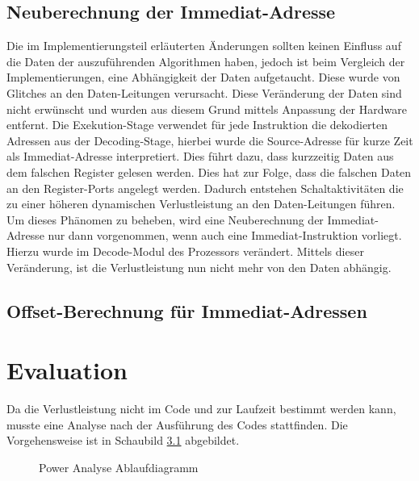 \section{Neuberechnung der Immediat-Adresse}
Die im Implementierungsteil erläuterten Änderungen sollten keinen Einfluss auf die Daten der auszuführenden Algorithmen haben, jedoch ist beim Vergleich der Implementierungen, eine Abhängigkeit der Daten aufgetaucht.
Diese wurde von Glitches an den Daten-Leitungen verursacht. Diese Veränderung der Daten sind nicht erwünscht und wurden aus diesem Grund mittels Anpassung der Hardware entfernt.
Die Exekution-Stage verwendet für jede Instruktion die dekodierten Adressen aus der Decoding-Stage, hierbei wurde die Source-Adresse für kurze Zeit als Immediat-Adresse interpretiert. Dies führt dazu, dass kurzzeitig Daten aus dem falschen Register gelesen werden. Dies hat zur Folge, dass die falschen Daten an den Register-Ports angelegt werden. Dadurch entstehen Schaltaktivitäten die zu einer höheren dynamischen Verlustleistung an den Daten-Leitungen führen. Um dieses Phänomen zu beheben,  wird eine Neuberechnung der Immediat-Adresse nur dann vorgenommen, wenn auch eine Immediat-Instruktion vorliegt. Hierzu wurde im Decode-Modul des Prozessors verändert. 
Mittels dieser Veränderung, ist die Verlustleistung nun nicht mehr von den Daten abhängig.

\section{Offset-Berechnung für Immediat-Adressen}


\chapter{Evaluation}
\label{chap:evaluation} 
Da die Verlustleistung nicht im Code und zur Laufzeit bestimmt werden kann, musste eine Analyse nach der Ausführung des Codes stattfinden. Die Vorgehensweise ist in Schaubild \ref{fig:flow_power_analyse} abgebildet.

\begin{scriptsize}
	\begin{figure}[htbp] 
		\centering
		
		\caption{Power Analyse Ablaufdiagramm}
		\label{fig:flow_power_analyse}
	\end{figure}
\end{scriptsize}

